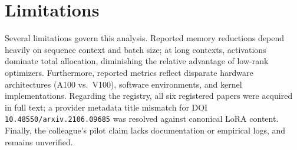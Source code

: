 \documentclass[11pt,a4paper]{article}
\begin{document}
\section{Limitations}
Several limitations govern this analysis. Reported memory reductions depend heavily on sequence context and batch size; at long contexts, activations dominate total allocation, diminishing the relative advantage of low-rank optimizers. Furthermore, reported metrics reflect disparate hardware architectures (A100 vs.\ V100), software environments, and kernel implementations. Regarding the registry, all six registered papers were acquired in full text; a provider metadata title mismatch for DOI \texttt{10.48550/arxiv.2106.09685} was resolved against canonical LoRA content. Finally, the colleague's pilot claim lacks documentation or empirical logs, and remains unverified.



\end{document}

